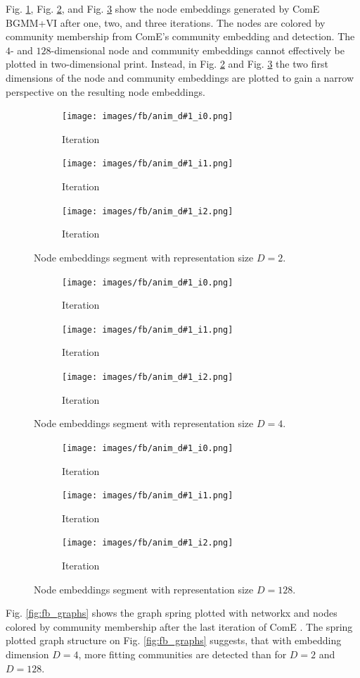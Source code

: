 \documentclass[conference]{IEEEtran}
\begin{document}
Fig. \ref{fig:fb_emb_anim_d2}, Fig. \ref{fig:fb_emb_anim_d4}, and Fig. \ref{fig:fb_emb_anim_d128} show the node embeddings generated by ComE BGMM+VI after one, two, and three iterations. The nodes are colored by community membership from ComE's community embedding and detection.
The $4$- and $128$-dimensional node and community embeddings cannot effectively be plotted in two-dimensional print. Instead, in Fig. \ref{fig:fb_emb_anim_d4} and Fig. \ref{fig:fb_emb_anim_d128} the two first dimensions of the node and community embeddings are plotted to gain a narrow perspective on the resulting node embeddings.

\newcommand{\fbEmbAnimD}[1]{
    \begin{figure}[htbp]
        \centering
        \begin{subfigure}{.33\textwidth}
            \centering
            \texttt{[image: images/fb/anim\_d\#1\_i0.png]}
            \caption{\nth{1} Iteration}
        \end{subfigure}%
        \begin{subfigure}{.33\textwidth}
            \centering
            \texttt{[image: images/fb/anim\_d\#1\_i1.png]}
            \caption{\nth{2} Iteration}
        \end{subfigure}%
        \begin{subfigure}{.33\textwidth}
            \centering
            \texttt{[image: images/fb/anim\_d\#1\_i2.png]}
            \caption{\nth{3} Iteration}
        \end{subfigure}%
        \caption{Node embeddings segment with representation size $D=#1$.}
        \label{fig:fb_emb_anim_d#1}
    \end{figure}
}

\fbEmbAnimD{2}
\fbEmbAnimD{4}
\fbEmbAnimD{128}

Fig. \ref{fig:fb_graphs} shows the graph spring plotted with networkx and nodes colored by community membership after the last iteration of ComE \cite{networkx}. The spring plotted graph structure on Fig. \ref{fig:fb_graphs} suggests, that with embedding dimension $D=4$, more fitting communities are detected than for $D=2$ and $D=128$.
\end{document}

